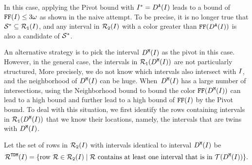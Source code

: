 


In this case, applying the Pivot bound with $I^* = D^\texttt{A}(I)$ leads to a bound of $\text{\texttt{FF}}(I) \leq 3 \omega$ as shown in the naive attempt.
To be precise, it is no longer true that $\mathcal{S}^* \subseteq \mathcal{R}_\texttt{1}(I)$, and any interval in $\mathcal{R}_\texttt{2}(I)$ with a color greater than $\text{\texttt{FF}}(D^\texttt{A}(I))$ is also a candidate of $\mathcal{S}^*$.

An alternative strategy is to pick the interval $D^\texttt{M}(I)$ as the pivot in this case.
However, in the general case, the intervals in $\mathcal{R}_\texttt{1}(D^\texttt{M}(I))$ are not particularly structured,
More precisely, we do not know which intervals also intersect with $I$, and the neighborhood of $D^\texttt{M}(I)$ can be huge. 
When~$D^\texttt{M}(I)$ has a large number of intersections, using the Neighborhood bound to bound the color $\text{\texttt{FF}}(D^\texttt{M}(I))$ can lead to a high bound and further lead to a high bound of $\text{\texttt{FF}}(I)$ by the Pivot bound.
To deal with this situation, we first identify the rows containing intervals in $\mathcal{R}_\texttt{1}(D^\texttt{M}(I))$ that we know their locations, namely, the intervals that are twins with $D^\texttt{M}(I)$.

\smallskip

\begin{definition}
    \shortversion{\label{def:Z_short}}
    \fullversion{\label{def:Z}}
    Let the set of rows in $\mathcal{R}_\texttt{2}(I)$ with intervals identical to interval $D^\texttt{M}(I)$ be 
    \[ \mathcal{R}^{\texttt{TDM}} (I ) = \{ \text{row } \mathcal{R} \in \mathcal{R}_\texttt{2}(I) \mid \mathcal{R} \text{ contains at least one interval that is in } \mathcal{T}(D^\texttt{M}(I))  \}.\]
\end{definition}

